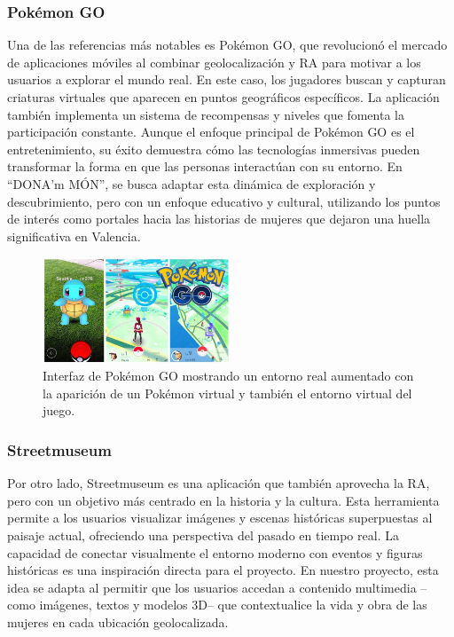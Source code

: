 \subsubsection{Pokémon GO}

Una de las referencias más notables es Pokémon GO, que revolucionó el mercado de aplicaciones móviles al combinar geolocalización y RA para motivar a los usuarios a explorar el mundo real. En este caso, los jugadores buscan y capturan criaturas virtuales que aparecen en puntos geográficos específicos. La aplicación también implementa un sistema de recompensas y niveles que fomenta la participación constante. Aunque el enfoque principal de Pokémon GO es el entretenimiento, su éxito demuestra cómo las tecnologías inmersivas pueden transformar la forma en que las personas interactúan con su entorno. En “DONA’m MÓN”, se busca adaptar esta dinámica de exploración y descubrimiento, pero con un enfoque educativo y cultural, utilizando los puntos de interés como portales hacia las historias de mujeres que dejaron una huella significativa en Valencia.

\begin{figure}[H]
    \centering
    \includegraphics[width=0.5\textwidth]{figs/pokemon_go.jpg}
    \caption{Interfaz de Pokémon GO mostrando un entorno real aumentado con la aparición de un Pokémon virtual y también el entorno virtual del juego.}
    \label{fig:pokemon_go}
\end{figure}

\subsubsection{Streetmuseum}

Por otro lado, Streetmuseum es una aplicación que también aprovecha la RA, pero con un objetivo más centrado en la historia y la cultura. Esta herramienta permite a los usuarios visualizar imágenes y escenas históricas superpuestas al paisaje actual, ofreciendo una perspectiva del pasado en tiempo real. La capacidad de conectar visualmente el entorno moderno con eventos y figuras históricas es una inspiración directa para el proyecto. En nuestro proyecto, esta idea se adapta al permitir que los usuarios accedan a contenido multimedia –como imágenes, textos y modelos 3D– que contextualice la vida y obra de las mujeres en cada ubicación geolocalizada.

